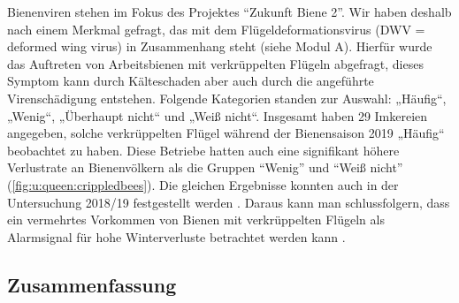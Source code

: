 Bienenviren stehen im Fokus des Projektes \enquote{Zukunft Biene 2}. Wir haben deshalb nach einem Merkmal gefragt,
das mit dem Flügeldeformationsvirus (DWV = deformed wing virus) in Zusammenhang steht (siehe Modul A). Hierfür wurde das Auftreten von Arbeitsbienen mit verkrüppelten Flügeln abgefragt, dieses Symptom kann durch Kälteschaden aber auch durch die angeführte Virenschädigung entstehen. Folgende Kategorien standen zur Auswahl: „Häufig``, „Wenig``, „Überhaupt nicht`` und „Weiß nicht``. 
\newline
Insgesamt haben 29 Imkereien angegeben, solche verkrüppelten Flügel während der Bienensaison 2019 „Häufig`` beobachtet zu haben. Diese Betriebe hatten auch eine signifikant höhere Verlustrate an Bienenvölkern als  die Gruppen \enquote{Wenig} und \enquote{Weiß nicht} (\cref{fig:u:queen:crippledbees}). Die gleichen Ergebnisse konnten auch in der Untersuchung 2018/19 festgestellt werden \citep{oberreiter2020}. Daraus kann man schlussfolgern, dass ein vermehrtes Vorkommen von Bienen mit verkrüppelten Flügeln als Alarmsignal für hohe Winterverluste betrachtet werden kann \citep{morawetz2019}.

\subsection{Zusammenfassung}

